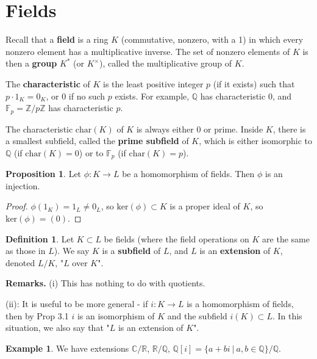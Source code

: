 \documentclass{article}
\theoremstyle{definition}
\newtheorem{prop}[theorem]{Proposition}
\newtheorem{example}{Example}[section]
\newtheorem{defn}{Definition}[section]
\begin{document}

\section{Fields}

Recall that a \textbf{field}  is a ring $K$ (commutative, nonzero, with a 1) in which every nonzero element has a multiplicative inverse. The set of nonzero elements of $K$ is then a \textbf{group} $K^*$ (or $K^\times$), called the multiplicative group of $K$.
\vspace{1mm}

The \textbf{characteristic} of $K$ is the least positive integer $p$ (if it exists) such that $p \cdot 1_K = 0_K$, or 0 if no such $p$ exists.
For example, $\mathbb{Q}$ has characteristic $0$, and $\mathbb{F}_p = \mathbb{Z}/p\mathbb{Z}$ has characteristic $p$. 
\vspace{1mm}

The characteristic $\text{char}(K)$ of $K$ is always either 0 or prime. Inside $K$, there is a smallest subfield, called the \textbf{prime subfield} of $K$, which is either isomorphic to $\mathbb{Q}$ (if $\text{char}(K)=0$) or to $\mathbb{F}_p$ (if $\text{char}(K)=p$). 

\begin{prop}
    Let $\phi : K \to L$ be a homomorphism of fields. Then $\phi$ is an injection.
\end{prop}
\begin{proof}
    $\phi(1_K) = 1_L \neq 0_L$, so $\text{ker}(\phi) \subset K$ is a proper ideal of $K$, so $\text{ker}(\phi) = (0)$.
\end{proof}

\begin{defn}
    Let $K \subset L$ be fields (where the field operations on $K$ are the same as those in $L$). We say $K$ is a \textbf{subfield}  of $L$, and $L$ is an \textbf{extension} of $K$, denoted $L/K$, "$L$ over $K$".
\end{defn}
\textbf{Remarks.} (i) This has nothing to do with quotients.
\vspace{1mm}

(ii): It is useful to be more general - if $i : K \to L$ is a homomorphism of fields, then by Prop 3.1 $i$ is an isomorphism of $K$ and the subfield $i(K) \subset L$. In this situation, we also say that "$L$ is an extension of $K$".

\begin{example}
    We have extensions $\mathbb{C}/\mathbb{R}$, $\mathbb{R}/\mathbb{Q}$, $\mathbb{Q}[i] = \{a+bi ~|~ a,b \in \mathbb{Q}\}/ \mathbb{Q}$.
\end{example}
\end{document}
